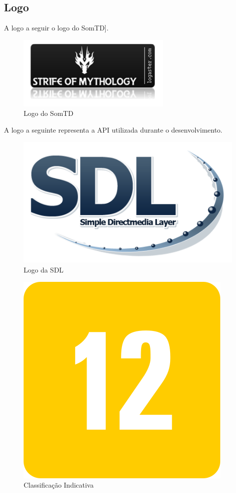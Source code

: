 \documentclass[11pt]{article} %
\begin{document}
\newpage

\subsection{Logo}

A logo a seguir o logo do SomTD].
\begin{figure}[!htp]
\centering
\includegraphics[scale=1.1]{res/logo.png}
\caption{Logo do SomTD}
\label{Logo do SomTD}
\end{figure}

A logo a seguinte representa a API utilizada durante o desenvolvimento.

\begin{figure}[!htp]
\centering
\includegraphics[scale=0.3]{res/Sdl-logo.png}
\caption{Logo da SDL}
\label{Logo da SDL}
\end{figure}

\begin{figure}[!htp]
\centering
\includegraphics[scale=0.3]{res/classification.png}
\caption{Classificação Indicativa}
\label{Classificação Indicativa}
\end{figure}
\end{document}
